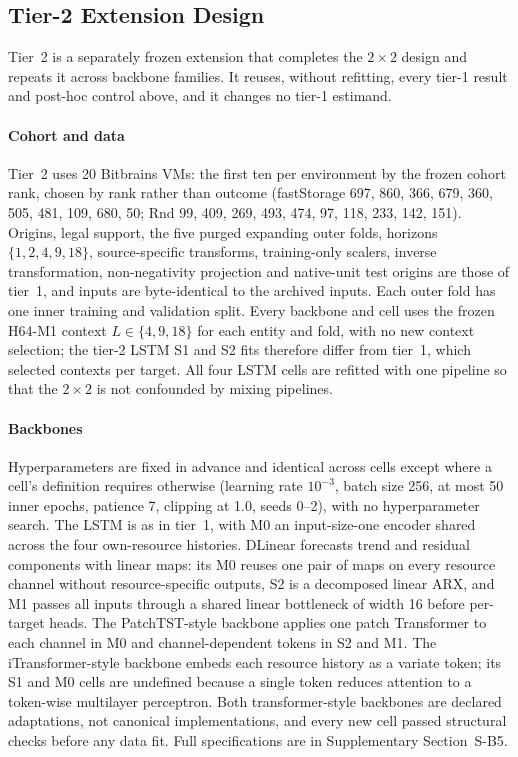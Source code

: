 \documentclass[5p,twocolumn]{elsarticle}
\begin{document}
\subsection{Tier-2 Extension Design}
\label{sec:tier2-design}

Tier~2 is a separately frozen extension that completes the $2\times2$ design
and repeats it across backbone families. It reuses, without refitting, every
tier-1 result and post-hoc control above, and it changes no tier-1 estimand.

\paragraph{Cohort and data} Tier~2 uses 20 Bitbrains VMs: the first ten per
environment by the frozen cohort rank, chosen by rank rather than outcome
(fastStorage 697, 860, 366, 679, 360, 505, 481, 109, 680, 50; Rnd 99, 409,
269, 493, 474, 97, 118, 233, 142, 151). Origins, legal support, the five
purged expanding outer folds, horizons $\{1,2,4,9,18\}$, source-specific
transforms, training-only scalers, inverse transformation, non-negativity
projection and native-unit test origins are those of tier~1, and inputs are
byte-identical to the archived inputs. Each outer fold has one inner
training and validation split. Every backbone and cell uses the frozen H64-M1
context $L\in\{4,9,18\}$ for each entity and fold, with no new context
selection; the tier-2 LSTM S1 and S2 fits therefore differ from tier~1, which
selected contexts per target. All four LSTM cells are refitted with one
pipeline so that the $2\times2$ is not confounded by mixing pipelines.

\paragraph{Backbones} Hyperparameters are fixed in advance and identical
across cells except where a cell's definition requires otherwise (learning
rate $10^{-3}$, batch size 256, at most 50 inner epochs, patience 7, clipping
at 1.0, seeds 0--2), with no hyperparameter search. The LSTM is as in tier~1,
with M0 an input-size-one encoder shared across the four own-resource
histories. DLinear \citep{Zeng2023DLinear} forecasts trend and residual
components with linear maps: its M0 reuses one pair of maps on every
resource channel without resource-specific outputs, S2 is a decomposed linear
ARX, and M1 passes all inputs through a shared linear bottleneck of width 16
before per-target heads. The PatchTST-style backbone \citep{Nie2023PatchTST}
applies one patch Transformer to each channel in M0 and channel-dependent
tokens in S2 and M1. The iTransformer-style backbone
\citep{Liu2024iTransformer} embeds each resource history as a variate token;
its S1 and M0 cells are undefined because a single token reduces attention to
a token-wise multilayer perceptron. Both transformer-style backbones are
declared adaptations, not canonical implementations, and every new cell
passed structural checks before any data fit. Full specifications are in
Supplementary Section~S-B5.
\end{document}
